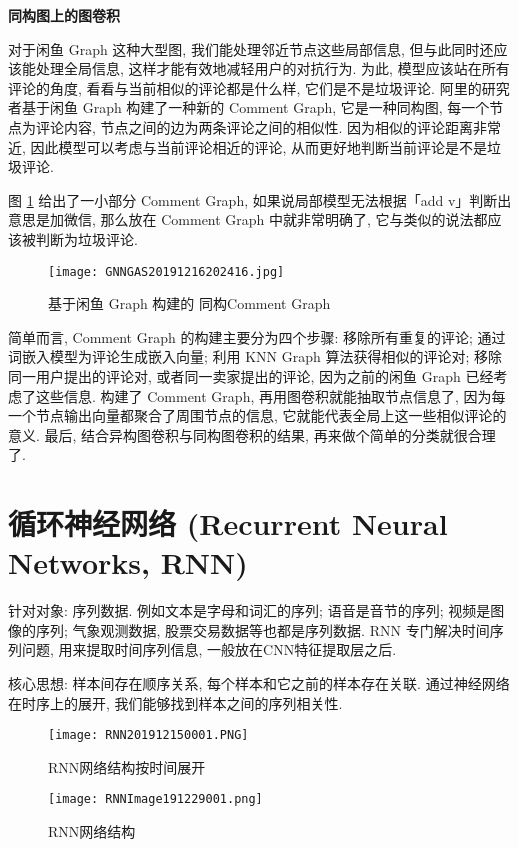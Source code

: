 \textbf{同构图上的图卷积}

对于闲鱼 Graph 这种大型图, 我们能处理邻近节点这些局部信息, 但与此同时还应该能处理全局信息, 这样才能有效地减轻用户的对抗行为.
为此, 模型应该站在所有评论的角度, 看看与当前相似的评论都是什么样, 它们是不是垃圾评论.
阿里的研究者基于闲鱼 Graph 构建了一种新的 Comment Graph, 它是一种同构图, 每一个节点为评论内容, 节点之间的边为两条评论之间的相似性.
因为相似的评论距离非常近, 因此模型可以考虑与当前评论相近的评论, 从而更好地判断当前评论是不是垃圾评论.

图 \ref{GNNGAS20191216202416} 给出了一小部分 Comment Graph, 如果说局部模型无法根据「add v」判断出意思是加微信, 那么放在 Comment Graph 中就非常明确了, 它与类似的说法都应该被判断为垃圾评论.
\begin{figure}[H]
    \centering
    \texttt{[image: GNNGAS20191216202416.jpg]}
    \caption{基于闲鱼 Graph 构建的 同构Comment Graph}
    \label{GNNGAS20191216202416}
    \vspace{-0.4cm}
\end{figure}
简单而言, Comment Graph 的构建主要分为四个步骤: 移除所有重复的评论;
通过词嵌入模型为评论生成嵌入向量; 利用 KNN Graph 算法获得相似的评论对;
移除同一用户提出的评论对, 或者同一卖家提出的评论, 因为之前的闲鱼 Graph 已经考虑了这些信息.
构建了 Comment Graph, 再用图卷积就能抽取节点信息了, 因为每一个节点输出向量都聚合了周围节点的信息, 它就能代表全局上这一些相似评论的意义.
最后, 结合异构图卷积与同构图卷积的结果, 再来做个简单的分类就很合理了.
\section{循环神经网络 (Recurrent Neural Networks, RNN)}
针对对象: 序列数据. 例如文本是字母和词汇的序列; 语音是音节的序列; 视频是图像的序列;
气象观测数据, 股票交易数据等也都是序列数据. RNN 专门解决时间序列问题, 用来提取时间序列信息, 一般放在CNN特征提取层之后.

核心思想: 样本间存在顺序关系, 每个样本和它之前的样本存在关联.
通过神经网络在时序上的展开, 我们能够找到样本之间的序列相关性.
\begin{figure}[H]
    \centering
    \texttt{[image: RNN201912150001.PNG]}
    \caption{RNN网络结构按时间展开}
    \label{RNN201912150001}
    \vspace{-0.4cm}
\end{figure}
\begin{figure}[H]
    \centering
    \texttt{[image: RNNImage191229001.png]}
    \caption{RNN网络结构}
    \label{RNNImage191229001}
    \vspace{-0.4cm}
\end{figure}


